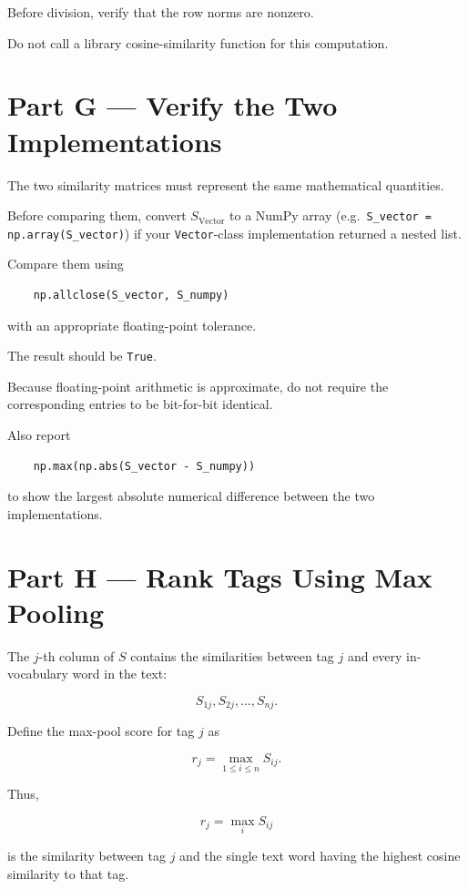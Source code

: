 \documentclass[12pt]{article}
\begin{document}
Before division, verify that the row norms are nonzero.

Do not call a library cosine-similarity function for this computation.

\section*{Part G --- Verify the Two Implementations}

The two similarity matrices must represent the same mathematical
quantities.

Before comparing them, convert \(S_{\mathrm{Vector}}\) to a NumPy
array (e.g.\ \texttt{S\_vector = np.array(S\_vector)}) if your
\texttt{Vector}-class implementation returned a nested list.

Compare them using

\begin{lstlisting}
    np.allclose(S_vector, S_numpy)
\end{lstlisting}

with an appropriate floating-point tolerance.

The result should be \texttt{True}.

Because floating-point arithmetic is approximate, do not require the
corresponding entries to be bit-for-bit identical.

Also report

\begin{lstlisting}
    np.max(np.abs(S_vector - S_numpy))
\end{lstlisting}

to show the largest absolute numerical difference between the two
implementations.

\section*{Part H --- Rank Tags Using Max Pooling}

The \(j\)-th column of \(S\) contains the similarities between tag
\(j\) and every in-vocabulary word in the text:

\[
S_{1j},S_{2j},\ldots,S_{nj}.
\]

Define the max-pool score for tag \(j\) as

\[
r_j
=
\max_{1\leq i\leq n}S_{ij}.
\]

Thus,

\[
\boxed{
r_j=\max_i S_{ij}
}
\]

is the similarity between tag \(j\) and the single text word having
the highest cosine similarity to that tag.
\end{document}

